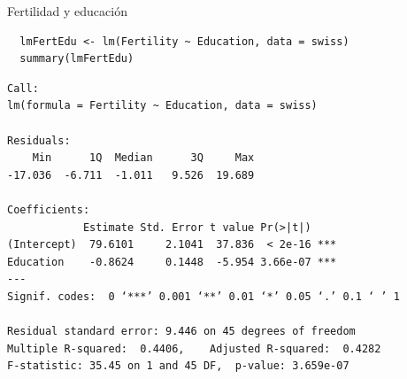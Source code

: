 \documentclass[xcolor={usenames,svgnames,dvipsnames}]{beamer}
\begin{document}
\begin{frame}[fragile,label=sec-3-1]{Fertilidad y educación}
 \lstset{language=R,label= ,caption= ,numbers=none}
\begin{lstlisting}
  lmFertEdu <- lm(Fertility ~ Education, data = swiss)
  summary(lmFertEdu)
\end{lstlisting}

\begin{verbatim}
Call:
lm(formula = Fertility ~ Education, data = swiss)

Residuals:
    Min      1Q  Median      3Q     Max 
-17.036  -6.711  -1.011   9.526  19.689 

Coefficients:
            Estimate Std. Error t value Pr(>|t|)    
(Intercept)  79.6101     2.1041  37.836  < 2e-16 ***
Education    -0.8624     0.1448  -5.954 3.66e-07 ***
---
Signif. codes:  0 ‘***’ 0.001 ‘**’ 0.01 ‘*’ 0.05 ‘.’ 0.1 ‘ ’ 1

Residual standard error: 9.446 on 45 degrees of freedom
Multiple R-squared:  0.4406,	Adjusted R-squared:  0.4282 
F-statistic: 35.45 on 1 and 45 DF,  p-value: 3.659e-07
\end{verbatim}
\end{frame}
\end{document}
